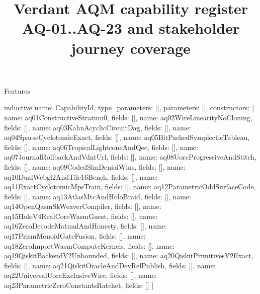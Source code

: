 \begin{lexlean}{Features}
\title{Verdant AQM capability register AQ-01..AQ-23 and stakeholder journey coverage}

\begin{semanticmodule}

inductive{
  name: CapabilityId,
  type_parameters: [],
  parameters: [],
  constructors: [
    {name: aq01ConstructiveStratum0, fields: []},
    {name: aq02WireLinearityNoCloning, fields: []},
    {name: aq03KahnAcyclicCircuitDag, fields: []},
    {name: aq04SparseCyclotomicExact, fields: []},
    {name: aq05BitPackedSymplecticTableau, fields: []},
    {name: aq06TropicalLightconeAndQec, fields: []},
    {name: aq07JournalRollbackAndVdntUrl, fields: []},
    {name: aq08UorcProgressiveAndStitch, fields: []},
    {name: aq09CodedSlmDenialWins, fields: []},
    {name: aq10DualWebgl2AndTile16Bench, fields: []},
    {name: aq11ExactCyclotomicMpsTrain, fields: []},
    {name: aq12ParametricOddSurfaceCode, fields: []},
    {name: aq13AtlasMtcAndHoloBraid, fields: []},
    {name: aq14OpenQasmSkWeaverCompiler, fields: []},
    {name: aq15HoloV4RealCoreWasmGuest, fields: []},
    {name: aq16ZeroDecodeMatmulAndHonesty, fields: []},
    {name: aq17PrismMonoidGateFusion, fields: []},
    {name: aq18ZeroImportWasmComputeKernels, fields: []},
    {name: aq19QiskitBackendV2Unbounded, fields: []},
    {name: aq20QiskitPrimitivesV2Exact, fields: []},
    {name: aq21QiskitOracleAndDevRelPublish, fields: []},
    {name: aq22UniversalUorcExclusiveWire, fields: []},
    {name: aq23ParametricZeroConstantsRatchet, fields: []}
  ]
}


\end{semanticmodule}
\end{lexlean}
